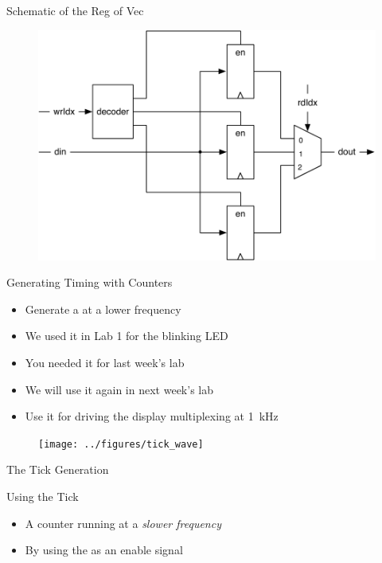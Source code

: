 \begin{frame}[fragile]{Schematic of the Reg of Vec}
\begin{figure}
  \includegraphics[scale=0.6]{../figures/vec-reg}
\end{figure}
\end{frame}

\begin{frame}[fragile]{Generating Timing with Counters}
\begin{itemize}
\item Generate a  at a lower frequency
\item We used it in Lab 1 for the blinking LED
\item You needed it for last week's lab
\item We will use it again in next week's lab
\item Use it for driving the display multiplexing at 1~kHz
\end{itemize}
\begin{figure}
  \texttt{[image: ../figures/tick\_wave]}
\end{figure}
\end{frame}


\begin{frame}[fragile]{The Tick Generation}
\end{frame}

\begin{frame}[fragile]{Using the Tick}
\begin{itemize}
\item A counter running at a \emph{slower frequency}
\item By using the  as an enable signal
\end{itemize}
\end{frame}

